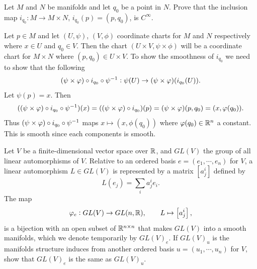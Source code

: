 \begin{problem}
	Let $ M $ and $ N $ be manifolds and let $ q_0 $ be a point in $ N $. Prove that the inclusion map $ i_{q_0}: M \to M\times N $, $ i_{q_0}(p) = (p,q_0) $, is $ C^\infty $.
\end{problem}
\begin{solution}
	Let $ p \in M $ and let $ (U,\psi) $, $ (V,\phi) $ coordinate charts for $ M $ and $  N $ respectively where $ x \in U $ and $ q_0 \in V $. Then the chart $ (U\times V, \psi\times\phi) $ will be a coordinate chart for $ M\times N $ where $ (p,q_0) \in U\times V $. To show the smoothness of $ i_{q_0} $ we need to show that the following 
	\[ (\psi\times\varphi) \circ i_{q_0} \circ \psi^{-1}: \psi(U) \to (\psi\times\varphi)(i_{q_0}(U)).\]
	Let $ \psi(p) = x $. Then 
	\[ ((\psi\times\varphi) \circ i_{q_0} \circ \psi^{-1})(x) = ((\psi\times\varphi)\circ i_{q_0})(p) = (\psi\times\varphi)(p,q_0) =  (x,\varphi(q_0)).\]
	Thus $ (\psi\times\varphi) \circ i_{q_0} \circ \psi^{-1} $ maps $ x \mapsto (x,\phi(q_0)) $ where $ \varphi(q_0) \in \mathbb{R}^n $ a constant. This is smooth since each components is smooth.
\end{solution}


\begin{problem}
	Let $ V $ be a finite-dimensional vector space over $ \mathbb{R} $, and  $ GL(V) $ the group of all linear automorphisms of $ V $. Relative to an ordered basis $ e = (e_1,\cdots,e_n) $ for $ V $, a linear automorphism $ L \in GL(V) $ is represented by a matrix $ \left[ a_j^i \right] $ defined by
	\[ L(e_j) = \sum_{i}a^i_j e_i. \]
	The map
	\[ \varphi_e : GL(V) \to GL(n,\mathbb{R}), \qquad L\mapsto \left[ a_j^i \right], \]
	is a bijection with an open subset of $ \mathbb{R}^{n\times n} $ that makes $ GL(V) $ into a smooth manifolds, which we denote temporarily by $ GL(V)_e $. If $ GL(V)_u $ is the manifolds structure induces from another ordered basis $ u = (u_1,\cdots, u_n) $   for $ V $, show that $ GL(V)_e $ is the same as $ GL(V)_u $.
\end{problem}

